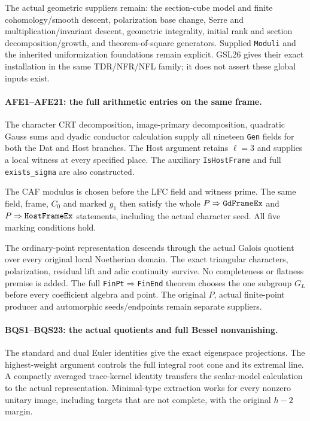 The actual geometric suppliers remain: the section-cube model and
finite cohomology/smooth descent, polarization base change, Serre
and multiplication/invariant descent, geometric integrality, initial rank and section
decomposition/growth, and theorem-of-square generators. Supplied
\texttt{Moduli} and the inherited uniformization foundations remain
explicit. GSL26 gives their exact installation in the same
TDR/NFR/NFL family; it does not assert these global inputs exist.

\paragraph{AFE1--AFE21: the full arithmetic entries on the same frame.}
The character CRT decomposition, image-primary decomposition,
quadratic Gauss sums and dyadic conductor calculation supply all
nineteen \texttt{Gen} fields for both the Dat and Host branches.
The Host argument retains $\ell=3$ and supplies a local witness
at every specified place. The auxiliary \texttt{Is\allowbreak Host\allowbreak Frame}
and full \texttt{exists\_\allowbreak sigma} are also constructed.

The CAF modulus is chosen before the LFC field and witness prime.
The same field, frame, $C_0$ and marked $g_1$ then satisfy the
whole $P\Rightarrow\texttt{Gd\allowbreak Frame\allowbreak Ex}$ and
$P\Rightarrow\texttt{Host\allowbreak Frame\allowbreak Ex}$ statements, including the
actual character seed. All five marking conditions hold.

The ordinary-point representation descends through the actual
Galois quotient over every original local Noetherian domain.
The exact triangular characters, polarization, residual lift and
adic continuity survive. No completeness or flatness premise is
added. The full \texttt{Fin\allowbreak Pt}\!$\Rightarrow$\!\texttt{Fin\allowbreak End}
theorem chooses the one subgroup $G_L$ before every coefficient
algebra and point. The original $P$, actual finite-point producer
and automorphic seeds/endpoints remain separate suppliers.

\paragraph{BQS1--BQS23: the actual quotients and full Bessel nonvanishing.}
The standard and dual Euler identities give the exact eigenspace
projections. The highest-weight argument controls the full integral
root cone and its extremal line. A compactly averaged trace-kernel
identity transfers the scalar-model calculation to the actual
representation. Minimal-type extraction works for every nonzero
unitary image, including targets that are not complete, with the
original $h-2$ margin.

